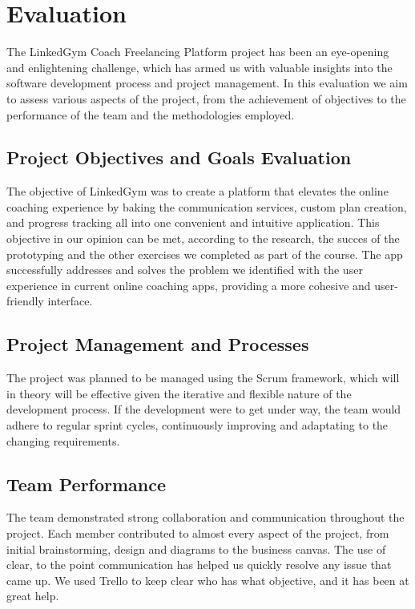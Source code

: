

\section{Evaluation}

The LinkedGym Coach Freelancing Platform project has been an eye-opening and enlightening challenge, which has armed us with valuable insights into the software development process and project management. In this evaluation we aim to assess various aspects of the project, from the achievement of objectives to the performance of the team and the methodologies employed.

\subsection{Project Objectives and Goals Evaluation}
The objective of LinkedGym was to create a platform that elevates the online coaching experience by baking the communication services, custom plan creation, and progress tracking all into one convenient and intuitive application. This objective in our opinion can be met, according to the research, the succes of the prototyping and the other exercises we completed as part of the course. The app successfully addresses and solves the problem we identified with the user experience in current online coaching apps, providing a more cohesive and user-friendly interface.

\subsection{Project Management and Processes}
The project was planned to be managed using the Scrum framework, which will in theory will be effective given the iterative and flexible nature of the development process. If the development were to get under way, the team would adhere to regular sprint cycles, continuously improving and adaptating to the changing requirements.

\subsection{Team Performance}
The team demonstrated strong collaboration and communication throughout the project. Each member contributed to almost every aspect of the project, from initial brainstorming, design and diagrams to the business canvas. The use of clear, to the point communication has helped us quickly resolve any issue that came up. We used Trello to keep clear who has what objective, and it has been at great help.

